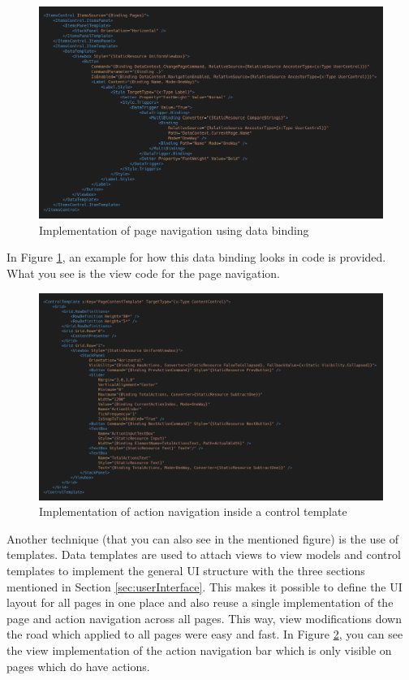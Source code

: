 \begin{figure}
\centering
\includegraphics[width=\textwidth]{figures/code/mvvm-arch/page-navigation-template.png}
\caption[Page navigation]{Implementation of page navigation using data binding}
\label{fig:mvvm.pagenavigation}
\end{figure}

In Figure \ref{fig:mvvm.pagenavigation}, an example for how this data binding looks in code is provided. What you see is the view code for the page navigation.

\begin{figure}
\centering
\includegraphics[width=\textwidth]{figures/code/mvvm-arch/action-navigation-template.png}
\caption[Action navigation]{Implementation of action navigation inside a control template}
\label{fig:mvvm.actionnavigation}
\end{figure}

Another technique (that you can also see in the mentioned figure) is the use of templates. Data templates are used to attach views to view models and control templates to implement the general UI structure with the three sections mentioned in Section \ref{sec:userInterface}. This makes it possible to define the UI layout for all pages in one place and also reuse a single implementation of the page and action navigation across all pages. This way, view modifications down the road which applied to all pages were easy and fast. In Figure \ref{fig:mvvm.actionnavigation}, you can see the view implementation of the action navigation bar which is only visible on pages which do have actions.

